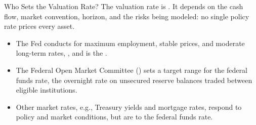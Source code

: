 \documentclass[aspectratio=169,11pt]{beamer}
\begin{document}
\begin{frame}{Who Sets the Valuation Rate?}
  The valuation rate is . It depends on the cash flow, market
  convention, horizon, and the risks being modeled: no single policy rate prices
  every asset.

  \vspace{0.5em}
  \vspace{0.25em}
  \begin{itemize}\setlength{\itemsep}{0.4em}
    \item The Fed conducts \textbf{} for maximum employment,
      stable prices, and moderate long-term rates, \textbf{}, and is the \textbf{}.
    \item The Federal Open Market Committee (\textbf{}) sets a target range for the federal funds rate, the
      overnight rate on unsecured reserve balances traded between eligible
      institutions. 
    \item Other market rates, e.g., Treasury yields and mortgage rates, respond to
      policy and market conditions, but are \textbf{}
      to the federal funds rate.
  \end{itemize}

\end{frame}
\end{document}
